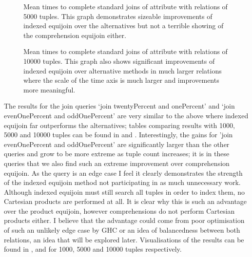\begin{figure}[p]
    
    \caption{Mean times to complete standard joins of 
     attribute with relations of 5000 tuples. This
graph demonstrates sizeable improvements of indexed equijoin over the
alternatives but not a terrible showing of the comprehension equijoin either.}
    \label{fig:benchmark:onePercent-5000}
\end{figure}

\begin{figure}[p]
    
    \caption{Mean times to complete standard joins of
     attribute with relations of 10000 tuples.
This graph also shows significant improvements of indexed equijoin over
alternative methods in much larger relations where the scale of the time axis is
much larger and improvements more meaningful.}
    \label{fig:benchmark:onePercent-10000}
\end{figure}

The results for the join queries `join twentyPercent and onePercent' and `join
evenOnePercent and oddOnePercent' are very similar to the above
where indexed equijoin far outperforms the alternatives; tables comparing
results with 1000, 5000 and 10000 tuples can be found in
 and
. Interestingly,
the gains for 'join evenOnePercent and oddOnePercent' are significantly larger
than the other queries and grow to be more extreme as tuple count increases; it
is in these queries that we also find such an extreme improvement over
comprehension equijoin. As the query is an edge case I feel it clearly
demonstrates the strength of the indexed equijoin method not participating in as
much unnecessary work. Although indexed equijoin must still search all tuples in
order to index them, no Cartesian products are performed at all. It is clear why
this is such an advantage over the product equijoin, however comprehensions do
not perform Cartesian products either. I believe that the advantage could come
from poor optimisation of such an unlikely edge case by GHC or an idea of
balancedness between both relations, an idea that will be explored later.
Visualisations of the results can be found in
,  and
 for 1000, 5000 and 10000 tuples respectively.

